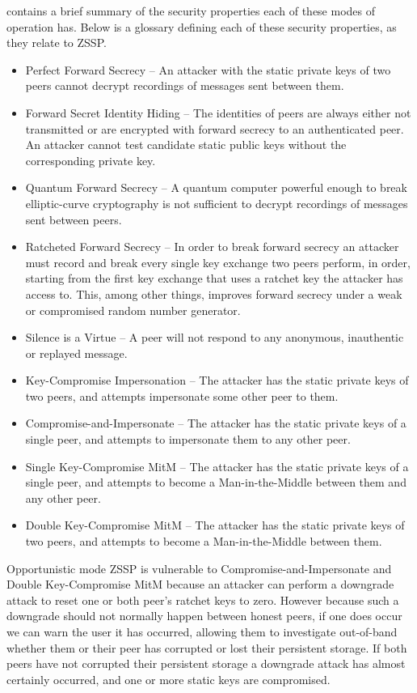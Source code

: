 \documentclass{article}
\begin{document}
 contains a brief summary of the security properties each of these modes of operation has. Below is a glossary defining each of these security properties, as they relate to ZSSP.

\begin{itemize}
	\item Perfect Forward Secrecy -- An attacker with the static private keys of two peers cannot decrypt recordings of messages sent between them.
	\item Forward Secret Identity Hiding -- The identities of peers are always either not transmitted or are encrypted with forward secrecy to an authenticated peer. An attacker cannot test candidate static public keys without the corresponding private key.
	\item Quantum Forward Secrecy -- A quantum computer powerful enough to break elliptic-curve cryptography is not sufficient to decrypt recordings of messages sent between peers.
	\item Ratcheted Forward Secrecy -- In order to break forward secrecy an attacker must record and break every single key exchange two peers perform, in order, starting from the first key exchange that uses a ratchet key the attacker has access to. This, among other things, improves forward secrecy under a weak or compromised random number generator.
	\item Silence is a Virtue -- A peer will not respond to any anonymous, inauthentic or replayed message.
	\item Key-Compromise Impersonation -- The attacker has the static private keys of two peers, and attempts impersonate some other peer to them.
	\item Compromise-and-Impersonate -- The attacker has the static private keys of a single peer, and attempts to impersonate them to any other peer.
	\item Single Key-Compromise MitM -- The attacker has the static private keys of a single peer, and attempts to become a Man-in-the-Middle between them and any other peer.
	\item Double Key-Compromise MitM -- The attacker has the static private keys of two peers, and attempts to become a Man-in-the-Middle between them.
\end{itemize}

Opportunistic mode ZSSP is vulnerable to Compromise-and-Impersonate and Double Key-Compromise MitM because an attacker can perform a downgrade attack to reset one or both peer's ratchet keys to zero. However because such a downgrade should not normally happen between honest peers, if one does occur we can warn the user it has occurred, allowing them to investigate out-of-band whether them or their peer has corrupted or lost their persistent storage. If both peers have not corrupted their persistent storage a downgrade attack has almost certainly occurred, and one or more static keys are compromised.
\end{document}
